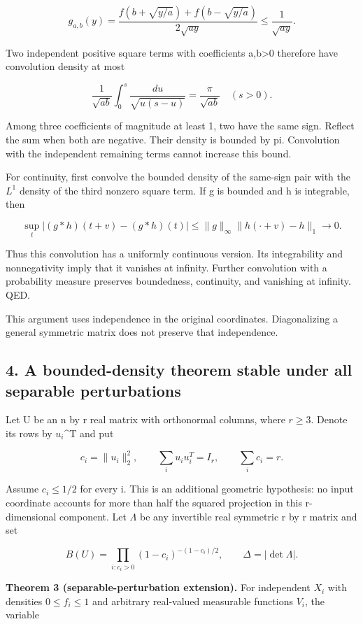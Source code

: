 \documentclass[
  11pt,
]{article}
\begin{document}
\[
g_{a,b}(y)=\frac{f(b+\sqrt{y/a})+f(b-\sqrt{y/a})}{2\sqrt{ay}}
\le\frac{1}{\sqrt{ay}}.
\]

Two independent positive square terms with coefficients a,b\textgreater0
therefore have convolution density at most

\[
\frac1{\sqrt{ab}}\int_0^s\frac{du}{\sqrt{u(s-u)}}
=\frac{\pi}{\sqrt{ab}}\quad(s>0).
\]

Among three coefficients of magnitude at least 1, two have the same
sign. Reflect the sum when both are negative. Their density is bounded
by pi. Convolution with the independent remaining terms cannot increase
this bound.

For continuity, first convolve the bounded density of the same-sign pair
with the \(L^1\) density of the third nonzero square term. If g is
bounded and h is integrable, then

\[
\sup_t |(g*h)(t+v)-(g*h)(t)|\le\lVert g\rVert_\infty\lVert h(\cdot+v)-h\rVert_1\to0.
\]

Thus this convolution has a uniformly continuous version. Its
integrability and nonnegativity imply that it vanishes at infinity.
Further convolution with a probability measure preserves boundedness,
continuity, and vanishing at infinity. QED.

This argument uses independence in the original coordinates.
Diagonalizing a general symmetric matrix does not preserve that
independence.

\subsection{4. A bounded-density theorem stable under all separable
perturbations}\label{a-bounded-density-theorem-stable-under-all-separable-perturbations}

Let U be an n by r real matrix with orthonormal columns, where
\(r\ge3\). Denote its rows by \(u_i\)\^{}T and put

\[
c_i=\lVert u_i\rVert_2^2,\qquad
\sum_i u_i u_i^T=I_r,\qquad\sum_i c_i=r.
\]

Assume \(c_i\le1/2\) for every i. This is an additional geometric
hypothesis: no input coordinate accounts for more than half the squared
projection in this r-dimensional component. Let \(\Lambda\) be any
invertible real symmetric r by r matrix and set

\[
B(U)=\prod_{i:c_i>0}(1-c_i)^{-(1-c_i)/2},\qquad
\Delta=|\det\Lambda|.
\]

\textbf{Theorem 3 (separable-perturbation extension).} For independent
\(X_i\) with densities \(0\le f_i\le1\) and arbitrary real-valued
measurable functions \(V_i\), the variable
\end{document}
